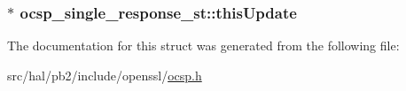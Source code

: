 \subsubsection[{\texorpdfstring{this\+Update}{thisUpdate}}]{$\ast$ ocsp\+\_\+single\+\_\+response\+\_\+st\+::this\+Update}\hypertarget{structocsp__single__response__st_a1ed7424e4d254f4af8499303dce9ffb2}{}\label{structocsp__single__response__st_a1ed7424e4d254f4af8499303dce9ffb2}


The documentation for this struct was generated from the following file\+:\begin{DoxyCompactItemize}
\item 
src/hal/pb2/include/openssl/\hyperlink{ocsp_8h}{ocsp.\+h}\end{DoxyCompactItemize}
